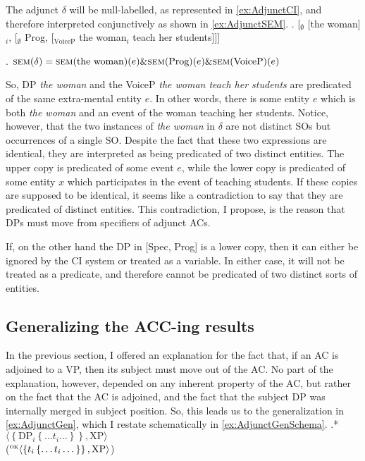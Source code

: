 \documentclass[MilwayThesis]{subfiles}
\begin{document}
The adjunct $\delta$ will be null-labelled, as represented in \cref{ex:AdjunctCI}, and therefore interpreted conjunctively as shown in \cref{ex:AdjunctSEM}.
\ex.\label{ex:AdjunctCI} [$_{\emptyset}$ [the woman]$_i$, [$_{\emptyset}$ Prog, [$_\text{VoiceP}$ the woman$_i$ teach her students]]]

\ex.\label{ex:AdjunctSEM} $\textsc{sem}(\delta) = \textsc{sem}(\text{the woman})(e) \& \textsc{sem}(\text{Prog})(e) \& \textsc{sem}(\text{VoiceP})(e)$

So, DP \textit{the woman} and the VoiceP \textit{the woman teach her students} are predicated of the same extra-mental entity $e$.
In other words, there is some entity $e$ which is both \textit{the woman} and an event of the woman teaching her students.
Notice, however, that the two instances of \textit{the woman} in $\delta$ are not distinct SOs but occurrences of a single SO.
Despite the fact that these two expressions are identical, they are interpreted as being predicated of two distinct entities.
The upper copy is predicated of some event $e$, while the lower copy is predicated of some entity $x$ which participates in the event of teaching students.
If these copies are supposed to be identical, it seems like a contradiction to say that they are predicated of distinct entities.
This contradiction, I propose, is the reason that DPs must move from specifiers of adjunct ACs.

If, on the other hand the DP in [Spec, Prog] is a lower copy, then it can either be ignored by the CI system or treated as a variable.
In either case, it will not be treated as a predicate, and therefore cannot be predicated of two distinct sorts of entities.
\subsection{Generalizing the ACC-ing results}
In the previous section, I offered an explanation for the fact that, if an AC is adjoined to a VP, then its subject must move out of the AC.
No part of the explanation, however, depended on any inherent property of the AC, but rather on the fact that the AC is adjoined, and the fact that the subject DP was internally merged in subject position. 
So, this leads us to the generalization in \cref{ex:AdjunctGen}, which I restate schematically in \cref{ex:AdjunctGenSchema}.
\ex.* $\langle \left\{ \text{DP}_{i} \left\{ \dots t_i \dots \right\} \right\}, \text{XP}\rangle$\label{ex:AdjunctGenSchema}\\
($^\textsc{ok}\langle \left\{ t_{i} \left\{ \dots t_i \dots \right\} \right\}, \text{XP}\rangle$)
\end{document}

